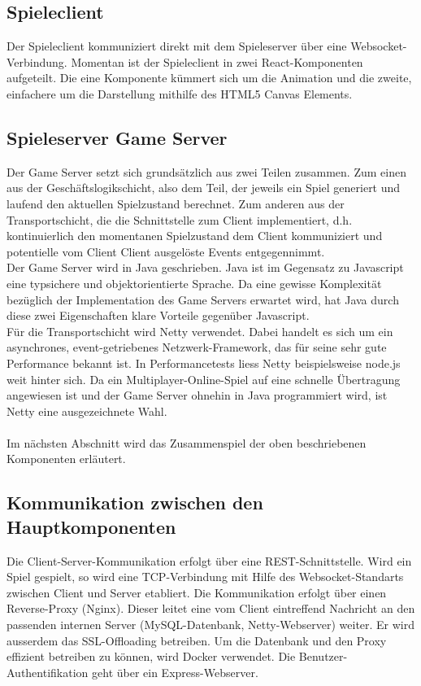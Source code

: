 \documentclass[11pt,ngerman]{article}
\begin{document}
        \subsection{Spieleclient}
        Der Spieleclient  kommuniziert direkt mit dem Spieleserver über eine \Gls{Websocket}-Verbindung. Momentan ist der Spieleclient  in zwei \Gls{React}-Komponenten aufgeteilt. Die eine Komponente kümmert sich um die Animation und die zweite, einfachere um die Darstellung mithilfe des \Gls{HTML5 Canvas} Elements.

        \label{SoftwarearchitekturGameServer}
        \subsection{Spieleserver \Gls{Game Server}}
        Der \Gls{Game Server} setzt sich grundsätzlich aus zwei Teilen zusammen. Zum einen aus der Geschäftslogikschicht, also dem Teil, der jeweils ein Spiel generiert und laufend den aktuellen Spielzustand berechnet. Zum anderen aus der Transportschicht, die die Schnittstelle zum Client implementiert, d.h. kontinuierlich den momentanen Spielzustand dem Client kommuniziert und potentielle vom Client Client ausgelöste Events entgegennimmt.\\
        Der \Gls{Game Server} wird in Java geschrieben. Java ist im Gegensatz zu Javascript eine typsichere und objektorientierte Sprache. Da eine gewisse Komplexität bezüglich der Implementation des \Gls{Game Server}s erwartet wird, hat Java durch diese zwei Eigenschaften klare Vorteile gegenüber Javascript.\\
        Für die Transportschicht wird Netty verwendet. Dabei handelt es sich um ein asynchrones, event-getriebenes Netzwerk-Framework, das für seine sehr gute Performance bekannt ist. In Performancetests liess Netty beispielsweise node.js weit hinter sich.\cite{NettyPerformancetests} Da ein Multiplayer-Online-Spiel auf eine schnelle Übertragung angewiesen ist und der \Gls{Game Server} ohnehin in Java programmiert wird, ist Netty eine ausgezeichnete Wahl.\\
        \\
        Im nächsten Abschnitt wird das Zusammenspiel der oben beschriebenen Komponenten erläutert.

        \subsection{Kommunikation zwischen den Hauptkomponenten}
        Die Client-Server-Kommunikation erfolgt über eine REST-Schnittstelle. Wird ein Spiel gespielt, so wird eine TCP-Verbindung mit Hilfe des \Gls{Websocket}-Standarts zwischen Client und Server etabliert. Die Kommunikation erfolgt über einen \Gls{Reverse-Proxy} (Nginx). Dieser leitet eine vom Client eintreffend Nachricht an den passenden internen Server (MySQL-Datenbank, Netty-Webserver) weiter. Er wird ausserdem das SSL-Offloading betreiben. Um die Datenbank und den Proxy effizient betreiben zu können, wird Docker verwendet. Die Benutzer-Authentifikation geht über ein Express-\Gls{Webserver}.\\
\end{document}
